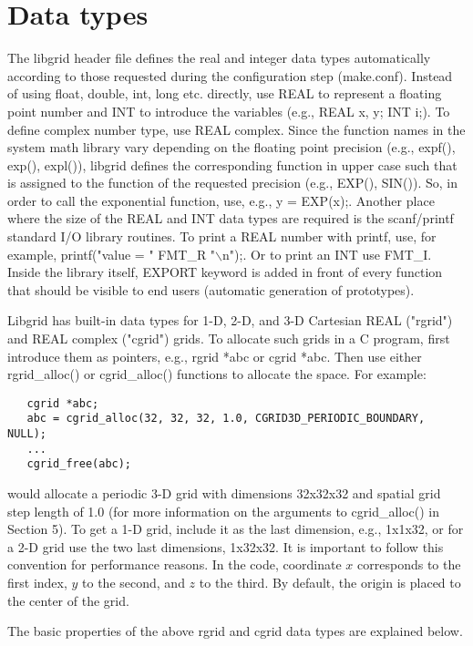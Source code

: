 \documentclass[12pt,letterpaper]{report}
\begin{document}
\section{Data types}

The libgrid header file defines the real and integer data types automatically according to those requested during the configuration step (make.conf). Instead of using float, double, int, long etc. directly, use REAL to represent a floating point number and INT to introduce the variables (e.g., REAL x, y; INT i;). To define complex number type, use REAL complex. Since the function names in the system math library vary depending on the floating point precision (e.g., expf(), exp(), expl()), libgrid defines the corresponding function in upper case such that is assigned to the function of the requested precision (e.g., EXP(), SIN()). So, in order to call the exponential function, use, e.g., y = EXP(x);. Another place where the size of the REAL and INT data types are required is the scanf/printf standard I/O library routines. To print a REAL number with printf, use, for example, printf("value = " FMT\_R "$\backslash$n");. Or to print an INT use FMT\_I. Inside the library itself, EXPORT keyword is added in front of every function that should be visible to end users (automatic generation of prototypes).

Libgrid has built-in data types for 1-D, 2-D, and 3-D Cartesian REAL ("rgrid") and REAL complex ("cgrid") grids. To allocate such grids in a C program, first introduce them as pointers, e.g., rgrid *abc or cgrid *abc. Then use either rgrid\_alloc() or cgrid\_alloc() functions to allocate the space. For example:
\begin{verbatim}
   cgrid *abc;
   abc = cgrid_alloc(32, 32, 32, 1.0, CGRID3D_PERIODIC_BOUNDARY, NULL);
   ...
   cgrid_free(abc);
\end{verbatim}
would allocate a periodic 3-D grid with dimensions 32x32x32 and spatial grid step length of 1.0 (for more information on the arguments to cgrid\_alloc() in Section 5). To get a 1-D grid, include it as the last dimension, e.g., 1x1x32, or for a 2-D grid use the two last dimensions, 1x32x32. It is important to follow this convention for performance reasons. In the code, coordinate $x$ corresponds to the first index, $y$ to the second, and $z$ to the third. By default, the origin is placed to the center of the grid.

The basic properties of the above rgrid and cgrid data types are explained below.
\end{document}
